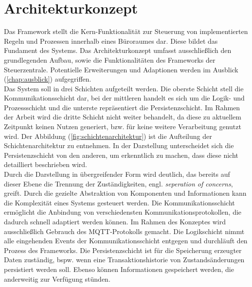 \section{Architekturkonzept}
\label{sec:architekturkonzept}
    Das Framework stellt die Kern-Funktionalität zur Steuerung von implementierten Regeln und Prozessen innerhalb eines 
    Büroraumes dar. Diese bildet das Fundament des Systems. Das Architekturkonzept umfasst ausschließlich den 
    grundlegenden Aufbau, sowie die Funktionalitäten des Frameworks der Steuerzentrale. Potentielle Erweiterungen und 
    Adaptionen werden im Ausblick (\ref{chap:ausblick}) aufgegriffen.
    \\ 
    \linebreak
    Das System soll in drei Schichten aufgeteilt werden. Die oberste Schicht stell die Kommunikationsschicht dar, bei der mittleren 
    handelt es sich um die Logik- und Prozessschicht und die unterste repräsentiert die Persistenzschicht. Im Rahmen der Arbeit wird 
    die dritte Schicht nicht weiter behandelt, da diese zu aktuellem Zeitpunkt keinen Nutzen generiert, bzw. für keine weitere Verarbeitung 
    genutzt wird. Der Abbildung (\ref{fig:schichtenarchitektur}) ist die Aufteilung der Schichtenarchitektur zu entnehmen. In 
    der Darstellung unterscheidet sich die Persistenzschicht von den anderen, um 
    erkenntlich zu machen, dass diese nicht detailliert beschrieben wird. 
    \\
    Durch die Darstellung in übergreifender Form wird deutlich, das bereits auf dieser Ebene die Trennung der Zuständigkeiten, engl. 
    \textit{seperation of concerns}, greift. Durch die gezielte Abstraktion von Komponenten und Informationen kann die Komplexität 
    eines Systems gesteuert werden. Die Kommunikationsschicht ermöglicht die Anbindung von verschiedensten Kommunikationsprotokollen, die 
    dadurch schnell adaptiert werden können. Im Rahmen des Konzeptes wird ausschließlich Gebrauch des \acs{MQTT}-Protokolls gemacht. 
    Die Logikschicht nimmt alle eingehenden Events der Kommunikationsschicht entgegen und durchläuft den Prozess des Frameworks. Die 
    Persistenzschicht ist für die Speicherung erzeugter Daten zuständig, bspw. wenn eine Transaktionshistorie von Zustandsänderungen 
    persistiert werden soll. Ebenso können Informationen gespeichert werden, die anderweitig zur Verfügung stünden. 
